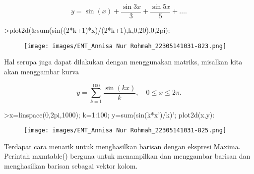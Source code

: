 \documentclass[a4paper,10pt]{article}
\begin{document}
\begin{eulernotebook}
\begin{eulercomment}
\end{eulercomment}
\begin{eulerformula}
\[
y=\sin(x) + \dfrac{\sin 3x}{3} + \dfrac{\sin 5x}{5} + \ldots.
\]
\end{eulerformula}
\begin{eulerprompt}
>plot2d(&sum(sin((2*k+1)*x)/(2*k+1),k,0,20),0,2pi):
\end{eulerprompt}
\begin{figure}[h]
    \centering
    \texttt{[image: images/EMT\_Annisa Nur Rohmah\_22305141031-823.png]}
\end{figure}
\begin{eulercomment}
Hal serupa juga dapat dilakukan dengan menggunakan matriks, misalkan
kita akan menggambar kurva

\end{eulercomment}
\begin{eulerformula}
\[
y = \sum_{k=1}^{100} \dfrac{\sin(kx)}{k},\quad 0\le x\le 2\pi.
\]
\end{eulerformula}
\begin{eulercomment}
\end{eulercomment}
\begin{eulerprompt}
>x=linspace(0,2pi,1000); k=1:100; y=sum(sin(k*x')/k)'; plot2d(x,y):
\end{eulerprompt}
\begin{figure}[h]
    \centering
    \texttt{[image: images/EMT\_Annisa Nur Rohmah\_22305141031-825.png]}
\end{figure}
\begin{eulercomment}
Terdapat cara menarik untuk menghasilkan barisan dengan ekspresi
Maxima. Perintah mxmtable() berguna untuk menampilkan dan menggambar
barisan dan menghasilkan barisan sebagai vektor kolom.


\end{eulercomment}
\end{eulernotebook}
\end{document}

